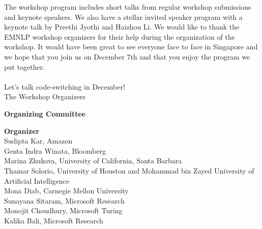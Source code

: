 \documentclass[11pt,oneside]{book}
\begin{document}
The workshop program includes short talks from regular workshop submissions and keynote speakers. 
We also have a stellar invited speaker program with a keynote talk by Preethi Jyothi and Haizhou Li. 
We would like to thank the EMNLP workshop organizers for their help during the organization of the workshop. 
It would have been great to see everyone face to face in Singapore and we hope that you join us on December 7th and that you enjoy the program we put together. \\ \\

%
Let’s talk code-switching in December! \\

%
The Workshop Organizers
  \newpage

{}
\begin{center}
{\Large \textbf{Organizing Committee}}
\end{center}
\vspace*{1cm}
\begin{description}
  \item{\bf Organizer}\vspace{2mm}\\
      Sudipta Kar, Amazon\\
      Genta Indra Winata, Bloomberg\\
      Marina Zhukova, University of California, Santa Barbara\\
      Thamar Solorio, University of Houston and Mohammad bin Zayed University of Artificial Intelligence\\
      Mona Diab, Carnegie Mellon University\\
      Sunayana Sitaram, Microsoft Research\\
      Monojit Choudhury, Microsoft Turing\\
      Kalika Bali, Microsoft Research\\
  \end{description}
\newpage
\end{document}
